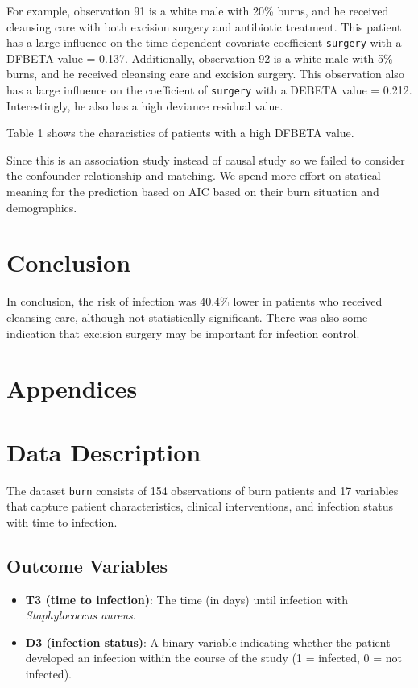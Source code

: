 \documentclass[12pt]{article}
\providecommand{\tightlist}{%
  \setlength{\itemsep}{0pt}\setlength{\parskip}{0pt}}
\begin{document}
For example, observation 91 is a white male with 20\% burns, and he
received cleansing care with both excision surgery and antibiotic
treatment. This patient has a large influence on the time-dependent
covariate coefficient \texttt{surgery} with a DFBETA value = 0.137.
Additionally, observation 92 is a white male with 5\% burns, and he
received cleansing care and excision surgery. This observation also has
a large influence on the coefficient of \texttt{surgery} with a DEBETA
value = 0.212. Interestingly, he also has a high deviance residual
value.

Table 1 shows the characistics of patients with a high DFBETA value.

Since this is an association study instead of causal study so we failed
to consider the confounder relationship and matching. We spend more
effort on statical meaning for the prediction based on AIC based on
their burn situation and demographics.

\section{Conclusion}\label{conclusion}

In conclusion, the risk of infection was 40.4\% lower in patients who
received cleansing care, although not statistically significant. There
was also some indication that excision surgery may be important for
infection control.

\section{Appendices}\label{appendices}

\section{Data Description}\label{data-description}

The dataset \texttt{burn} consists of 154 observations of burn patients
and 17 variables that capture patient characteristics, clinical
interventions, and infection status with time to infection.

\subsection{\texorpdfstring{\textbf{Outcome
Variables}}{Outcome Variables}}\label{outcome-variables}

\begin{itemize}
\tightlist
\item
  \textbf{T3 (time to infection)}: The time (in days) until infection
  with \emph{Staphylococcus aureus}.
\item
  \textbf{D3 (infection status)}: A binary variable indicating whether
  the patient developed an infection within the course of the study (1 =
  infected, 0 = not infected).
\end{itemize}
\end{document}
